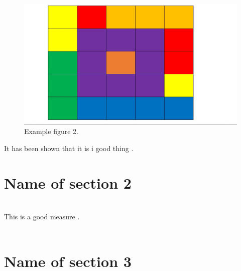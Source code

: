 \documentclass[../main.tex]{subfiles}
\begin{document}
    \begin{figure}[H]
    \centering
    \includegraphics[width=1.0\textwidth]{Figures/example_figure2.JPG}
    \caption{Example figure 2.}
    \label{figexample_figure2}
    \end{figure}
    It has been shown that it is i good thing \citep{example_reference2}. 
    
    \section{Name of section 2}
    \lipsum[1]\\
    This is a good measure \citep{example_reference3}.\\ \\
    
    
    \section{Name of section 3}
    \lipsum[1]
    
\biblio
\cleardoublepage
\end{document}
